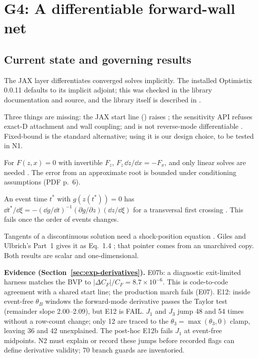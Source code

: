 \section{G4: A differentiable forward-wall net}
\label{sec:g4}
\subsection{Current state and governing results}
The JAX layer differentiates converged solves implicitly. The installed Optimistix
0.0.11 defaults to its implicit adjoint; this was checked in the library documentation
and source, and the library itself is described in \cite{optimistix}.

Three things are missing: the JAX start line () raises
; the sensitivity API refuses exact-D attachment and wall
coupling; and  is not reverse-mode differentiable
\cite{jaxwhileloop}. Fixed-bound  \cite{jaxscan,bradbury2018} is the
standard alternative; using it is our design choice, to be tested in N1.

For $F(z,x)=0$ with invertible $F_z$, $F_z\,\dd z/\dd x=-F_x$, and only linear solves
are needed \cite[PDF pp.~3--4, Eqs.~1--3]{blondel}. The error from an approximate root
is bounded under conditioning assumptions (PDF p.~6).

An event time $t^*$ with $g(z(t^*))=0$ has
$\dd t^*/\dd\xi=-(\dd g/\dd t)^{-1}(\partial g/\partial z)(\dd z/\dd\xi)$ for a
transversal first crossing \cite[PDF p.~4, Eqs.~9--11]{chen2021}. This fails once the
order of events changes.

Tangents of a discontinuous solution need a shock-position equation
\cite[PDF pp.~5--6, Lemma~2.6]{herty2021}. Giles and Ulbrich's Part~1 gives it as
Eq.~1.4 \cite[printed pp.~884--885]{giles2010a}; that pointer comes from an
unarchived copy. Both results are scalar and one-dimensional.

\textbf{Evidence (Section~\ref{sec:exp-derivatives}).} E07b: a diagnostic exit-limited
harness matches the BVP to $|\Delta C_F|/C_F=8.7\times10^{-6}$. This is code-to-code
agreement with a shared start line; the production march fails (E07). E12: inside
event-free $\theta_B$ windows the forward-mode derivative passes the Taylor test
(remainder slope 2.00--2.09), but E12 is FAIL. $J_1$ and $J_3$ jump 48 and 54 times
without a row-count change; only 12 are traced to the $\theta_3=\max(\theta_3,0)$
clamp, leaving 36 and 42 unexplained. The post-hoc E12b fails $J_1$ at event-free
midpoints. N2 must explain or record these jumps before recorded flags can define
derivative validity; 70 branch guards are inventoried.

